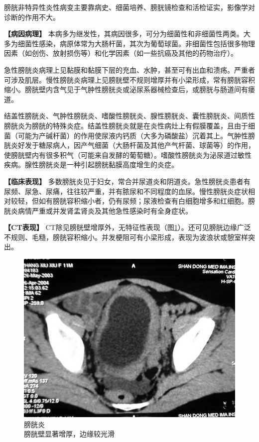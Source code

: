 膀胱非特异性炎性病变主要靠病史、细菌培养、膀胱镜检查和活检证实，影像学对诊断的作用不大。

\textbf{【病因病理】}
本病多为继发性，其病因很多，可分为细菌性和非细菌性两类。大多为细菌性感染，病原体常为大肠杆菌，其次为葡萄球菌。非细菌性包括很多物理因素（如创伤、放射损伤等）和化学因素（如一些抗癌及其他的药物治疗）。

急性膀胱炎病理上见黏膜和黏膜下层的充血、水肿，甚至可有出血和溃疡。严重者可涉及肌层。慢性膀胱炎病理上见膀胱壁不规则增厚并有小梁形成，常有膀胱容积缩小。膀胱壁内含气见于气肿性膀胱炎或泌尿系器械检查后，或膀胱与肠道间有瘘道。

结盖性膀胱炎、气肿性膀胱炎、嗜酸性膀胱炎、腺性膀胱炎、囊性膀胱炎、间质性膀胱炎为膀胱的特殊炎症。结盖性膀胱炎就是在炎性病灶上有假膜覆盖，且由于细菌（可能为产碱杆菌）的作用使尿液内钙质（大多为磷酸盐）沉着其上。气肿性膀胱炎好发于糖尿病人，因产气细菌（大肠杆菌及其他产气杆菌、球菌等）的作用，使膀胱壁内有很多积气（可能来自发酵的葡萄糖）。嗜酸性膀胱炎为泌尿道过敏性疾病。腺性膀胱炎是一种引起膀胱黏膜高度增生的炎症。

\textbf{【临床表现】}
多数膀胱炎见于妇女，常合并尿道炎和阴道炎。急性膀胱炎患者有尿频、尿急、尿痛，往往较严重，并有脓尿和不同程度的血尿。慢性膀胱炎症状相对较轻，但如有膀胱容积缩小者，仍有尿频；尿液检查有白细胞增多和红细胞。膀胱炎病情严重或并发肾盂肾炎及其他急性感染时有全身症状。

\textbf{【CT表现】}
CT除见膀胱壁增厚外，无特征性表现（图\ref{fig15-14}）。还可见膀胱边缘广泛不规则、毛糙，膀胱容积缩小。并发梗阻可有小梁形成，表现为波浪状或憩室样突出。

\begin{figure}[!htbp]
 \centering
 \includegraphics[width=.7\textwidth,height=\textheight,keepaspectratio]{./images/Image00329.jpg}
 \captionsetup{justification=centering}
 \caption{膀胱炎\\{\small 膀胱壁显著增厚，边缘较光滑}}
 \label{fig15-14}
  \end{figure} 

